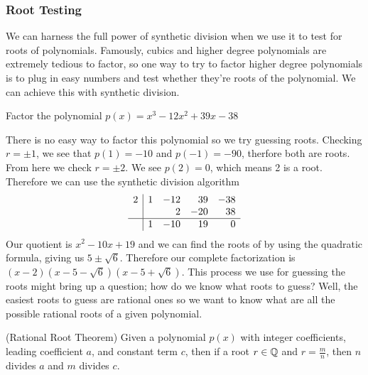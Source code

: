 \documentclass[11pt]{article}
\begin{document}
\subsubsection*{Root Testing}
We can harness the full power of synthetic division when we use it to test for roots of polynomials. Famously, cubics and higher degree polynomials are extremely tedious to factor, so one way to try to factor higher degree polynomials is to plug in easy numbers and test whether they're roots of the polynomial. We can achieve this with synthetic division.
\begin{example}
Factor the polynomial $p(x)=x^3-12x^2+39x-38$
\end{example}
There is no easy way to factor this polynomial so we try  guessing roots. Checking $r = \pm 1$, we see that $p(1) = -10$ and $p(-1) = -90$, therfore both are roots. From here we check $r=\pm 2$. We see $p(2) = 0$, which means 2 is a root. Therefore we can use the synthetic division algorithm
\[
\begin{array}{r|rrrr}
    2 & 1 & -12 & 39 & -38 \\
     & & 2 & -20 & 38 \\
     \hline
     & 1 & -10 & 19 & 0 
\end{array}
\]
Our quotient is $x^2-10x+19$ and we can find the roots of by using the quadratic formula, giving us $5\pm\sqrt{6}$. Therefore our complete factorization is $(x-2)(x-5-\sqrt{6})(x-5+\sqrt{6})$. This process we use for guessing the roots might bring up a question; how do we know what roots to guess? Well, the easiest roots to guess are rational ones so we want to know what are all the possible rational roots of a given polynomial.
\begin{theorem}{(Rational Root Theorem)}
Given a polynomial $p(x)$ with integer coefficients,  leading coefficient $a$, and constant term $c$, then if a root $r\in \mathbb Q$ and $r = \frac{m}{n}$, then $n$ divides $a$ and $m$ divides $c$.
\end{theorem}
\end{document}
